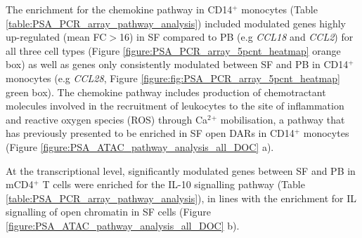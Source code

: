 The enrichment for the chemokine pathway in CD14$^+$ monocytes (Table \ref{table:PSA_PCR_array_pathway_analysis}) included modulated genes highly up-regulated (mean FC$>$16) in SF compared to PB (e.g \textit{CCL18} and \textit{CCL2}) for all three cell types (Figure \ref{figure:PSA_PCR_array_5pcnt_heatmap} orange box) as well as genes only consistently modulated between SF and PB in CD14$^+$ monocytes (e.g \textit{CCL28}, Figure \ref{figure:fig:PSA_PCR_array_5pcnt_heatmap} green box). The chemokine pathway includes production of chemotractant molecules involved in the recruitment of leukocytes to the site of inflammation and reactive oxygen species (ROS) through Ca$^2$$^+$ mobilisation, a pathway that has previously presented to be enriched in SF open DARs in CD14$^+$ monocytes (Figure \ref{figure:PSA_ATAC_pathway_analysis_all_DOC} a).

At the transcriptional level, significantly modulated genes between SF and PB in mCD4$^+$ T cells were enriched for the IL-10 signalling pathway (Table \ref{table:PSA_PCR_array_pathway_analysis}), in lines with the enrichment for IL signalling of open chromatin in SF cells (Figure \ref{figure:PSA_ATAC_pathway_analysis_all_DOC} b). %


